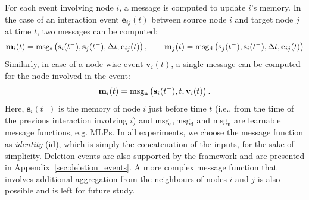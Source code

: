 \documentclass{article}
\begin{document}
For each event involving node $i$, a message is computed to update $i$'s memory. 
In the case of an interaction event $\mathbf{e}_{ij}(t)$ between source node $i$ and target node $j$ at time $t$,  
two messages can be computed:\vspace{-1mm}
\begin{eqnarray}
    \mathbf{m}_i(t) = \mathrm{msg_s}\left(\mathbf{s}_i(t^-), \mathbf{s}_j(t^-), \Delta t, \mathbf{e}_{ij}(t)\right), \quad\quad
    \mathbf{m}_j(t) = \mathrm{msg_d}\left(\mathbf{s}_j(t^-), \mathbf{s}_i(t^-), \Delta t, \mathbf{e}_{ij}(t)\right)\vspace{-2mm}
\end{eqnarray}
%
%
Similarly, in case of a node-wise event $\mathbf{v}_i(t)$, a single message can be computed for the node involved in the event: \vspace{-2mm}
%
\begin{eqnarray}
    \mathbf{m}_i(t) = \mathrm{msg_n}\left(\mathbf{s}_i(t^-), t, \mathbf{v}_{i}(t)\right).\vspace{-1mm} %
\end{eqnarray}
%
Here, $\mathbf{s}_i(t^-)$ is the memory of node $i$ just before time $t$ (i.e., from the time of the previous interaction involving $i$) 
and $\mathrm{msg_s}, \mathrm{msg_d}$ and $\mathrm{msg_n}$ are learnable message functions, e.g. MLPs. 
%
In all experiments, we choose the message function as {\em identity} (id), which is simply the concatenation of the inputs, for the sake of simplicity. Deletion events are also supported by the framework and are presented in Appendix~\ref{sec:deletion_events}. 
%
A more complex message function that involves additional aggregation from the neighbours of nodes $i$ and $j$ is also possible and is left for future study.
\end{document}
